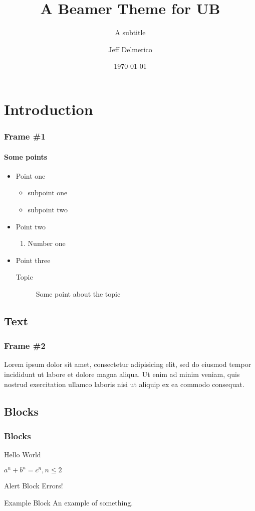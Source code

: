 \documentclass{beamer}
\title{A Beamer Theme for UB}
\subtitle{A subtitle}
\author{Jeff Delmerico}
\date{\today}
\institute{\url{jad12@buffalo.edu}}
\begin{document}
\begin{frame}
\titlepage
\end{frame}


\section{Introduction}
\begin{frame}
\frametitle{Frame \#1}
\framesubtitle{Some points}
\begin{itemize}
\item Point one
	\begin{itemize}
	\item subpoint one
	\item subpoint two
	\end{itemize}
\item Point two
	\begin{enumerate}
	\item Number one
	\end{enumerate}
\item Point three
	\begin{description}
	\item[Topic] Some point about the topic 
	\end{description}
\end{itemize}
\end{frame}

\subsection{Text}
\begin{frame}
\frametitle{Frame \#2}
Lorem ipsum dolor sit amet, consectetur adipisicing elit, sed do eiusmod tempor incididunt ut labore et dolore magna aliqua. Ut enim ad minim veniam, quis nostrud exercitation ullamco laboris nisi ut aliquip ex ea commodo consequat.
\end{frame}

\subsection{Blocks}
\begin{frame}
\frametitle{Blocks}
\begin{definition}[Greetings]
Hello World
\end{definition}

\begin{theorem}
$a^n + b^n = c^n, n \leq 2$
\end{theorem}

\begin{alertblock}{Alert Block}
Errors!
\end{alertblock}

\begin{exampleblock}{Example Block}
An example of something.
\end{exampleblock}

\end{frame}
\end{document}

